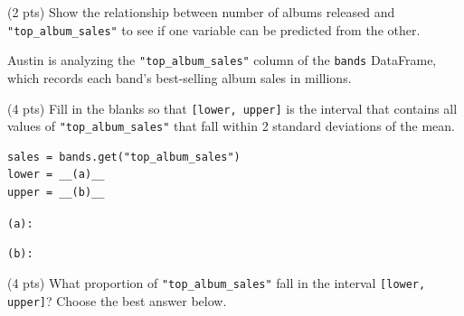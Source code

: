 \documentclass[twoside,12pt]{article}
\begin{document}
\begin{probset}
\begin{prob}[(10 pts)]
\begin{subprobset}
\begin{subprob}
\smallskip
{}

\end{subprob}
\begin{subprob}(2 pts)
Show the relationship between number of albums released and \texttt{"top\_album\_sales"} to see if one variable can be predicted from the other.

\smallskip
{}
\end{subprob}

\end{subprobset}

\end{prob}

\newpage

\begin{prob}[(8 pts)]

Austin is analyzing the \texttt{"top\_album\_sales"} column of the \texttt{bands} DataFrame, which records each band's best-selling album sales in millions. 

\begin{subprobset}

\begin{subprob}(4 pts)
Fill in the blanks so that \texttt{[lower, upper]} is the interval that contains all values of \texttt{"top\_album\_sales"} that fall within 2 standard deviations of the mean.

\begin{verbatim}
sales = bands.get("top_album_sales")
lower = __(a)__
upper = __(b)__
\end{verbatim}

\texttt{(a):} 

\smallskip
\texttt{(b):} 

\begin{soln}

\end{soln}

\end{subprob}

\bigskip

\begin{subprob}(4 pts)
What proportion of \texttt{"top\_album\_sales"} fall in the interval \texttt{[lower, upper]}? Choose the best answer below.

\medskip



\end{subprob}
\end{subprobset}
\end{prob}
\end{probset}
\end{document}
